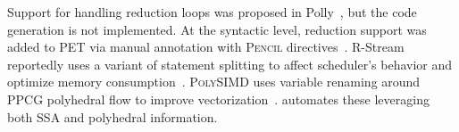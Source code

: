 Support for handling reduction loops was proposed in Polly~\cite{polly_reduction}, but the code generation is not implemented. At the syntactic level, reduction support was added to PET via manual annotation with \textsc{Pencil} directives~\cite{reduction_drawing}. R-Stream reportedly uses a variant of statement splitting to affect scheduler's behavior and optimize memory consumption~\cite{rstream}. \textsc{PolySIMD} uses variable renaming around \textsc{PPCG} polyhedral flow to improve vectorization~\cite{chatarasi2018unified}. \tool automates these leveraging both SSA and polyhedral information.



